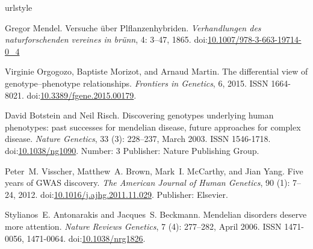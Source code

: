 \documentclass{eptcs}
\providecommand{\urlalt}[2]{\href{#1}{#2}}
\providecommand{\doi}[1]{doi:\urlalt{http://dx.doi.org/#1}{#1}}
\begin{document}
\begin{thebibliography}{}
\providecommand{\natexlab}[1]{#1}
\providecommand{\url}[1]{\texttt{#1}}
\expandafter\ifx\csname urlstyle\endcsname\relax
  \providecommand{\doi}[1]{doi: #1}\else
  \providecommand{\doi}{doi: \begingroup \urlstyle{rm}\Url}\fi
  
Gregor Mendel.
\newblock Versuche über {Plflanzenhybriden}.
\newblock \emph{Verhandlungen des naturforschenden vereines in brünn}, 4: 3--47, 1865.
\newblock \doi{10.1007/978-3-663-19714-0\_4}


Virginie Orgogozo, Baptiste Morizot, and Arnaud Martin.
\newblock The differential view of genotype–phenotype relationships.
\newblock \emph{Frontiers in Genetics}, 6, 2015.
\newblock ISSN 1664-8021.
\newblock \doi{10.3389/fgene.2015.00179}.

David Botstein and Neil Risch.
\newblock Discovering genotypes underlying human phenotypes: past successes for mendelian disease, future approaches for complex disease.
\newblock \emph{Nature Genetics}, 33 (3): 228--237, March 2003.
\newblock ISSN 1546-1718.
\newblock \doi{10.1038/ng1090}.
\newblock Number: 3 Publisher: Nature Publishing Group.

Peter~M. Visscher, Matthew~A. Brown, Mark~I. McCarthy, and Jian Yang.
\newblock Five years of {GWAS} discovery.
\newblock \emph{The American Journal of Human Genetics}, 90 (1): 7--24, 2012.
\newblock \doi{10.1016/j.ajhg.2011.11.029}.
\newblock Publisher: Elsevier.

Stylianos~E. Antonarakis and Jacques~S. Beckmann.
\newblock Mendelian disorders deserve more attention.
\newblock \emph{Nature Reviews Genetics}, 7 (4): 277--282, April 2006.
\newblock ISSN 1471-0056, 1471-0064.
\newblock \doi{10.1038/nrg1826}.


\end{thebibliography}
\end{document}
